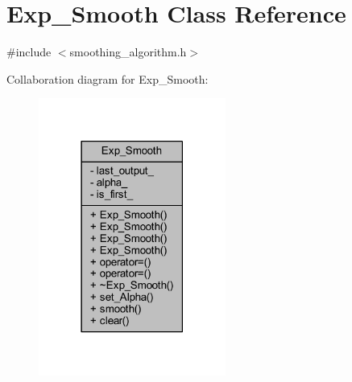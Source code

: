 \hypertarget{class_exp___smooth}{}\section{Exp\+\_\+\+Smooth Class Reference}
\label{class_exp___smooth}


{\ttfamily \#include $<$smoothing\+\_\+algorithm.\+h$>$}



Collaboration diagram for Exp\+\_\+\+Smooth\+:
\nopagebreak
\begin{figure}[H]
\begin{center}
\leavevmode
\includegraphics[width=174pt]{class_exp___smooth__coll__graph}
\end{center}
\end{figure}
